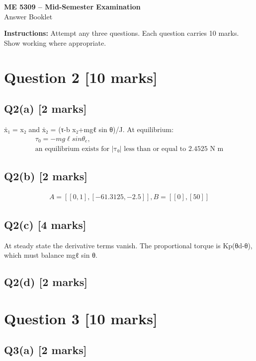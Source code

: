 \documentclass[11pt,a4paper]{article}
\begin{document}
\begin{center}
{\Large\bfseries ME 5309 -- Mid-Semester Examination}\\[3pt]
{\large Answer Booklet}\\[8pt]
\end{center}
\textbf{Instructions:} Attempt any three questions. Each question carries 10 marks. Show working where appropriate.
\section*{Question 2 \hfill [10 marks]}
\subsection*{Q2(a) \hfill [2 marks]}

ẋ₁ = x₂ and ẋ₂ = (τ-b x₂+mgℓ sin θ)/J.
At equilibrium:\[\begin{aligned}τ_0 = -mg\ell sin \theta_e,\\ \text{an equilibrium exists for |τ₀| less than or equal to 2.4525 N m}\end{aligned}\]

\subsection*{Q2(b) \hfill [2 marks]}

\[\begin{aligned}A = [[0,1], [-61.3125,-2.5]], B = [[0],[50]]\end{aligned}\]

\subsection*{Q2(c) \hfill [4 marks]}

At steady state the derivative terms vanish.
The proportional torque is Kp(θd-θ), which must balance mgℓ sin θ.

\subsection*{Q2(d) \hfill [2 marks]}

\vspace{2mm}

\section*{Question 3 \hfill [10 marks]}
\subsection*{Q3(a) \hfill [2 marks]}
\end{document}
